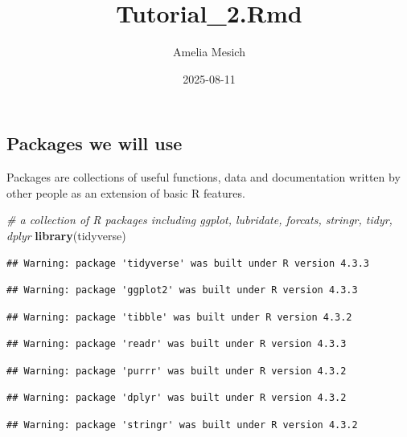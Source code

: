 \documentclass[
]{article}
\title{Tutorial\_2.Rmd}
\author{Amelia Mesich}
\date{2025-08-11}
\newenvironment{Shaded}{\begin{snugshade}}{\end{snugshade}}
\newcommand{\CommentTok}[1]{\textcolor[rgb]{0.56,0.35,0.01}{\textit{#1}}}
\newcommand{\FunctionTok}[1]{\textcolor[rgb]{0.13,0.29,0.53}{\textbf{#1}}}
\newcommand{\NormalTok}[1]{#1}
\begin{document}
\maketitle

\hypertarget{packages-we-will-use}{%
\subsection{Packages we will use}\label{packages-we-will-use}}

Packages are collections of useful functions, data and documentation
written by other people as an extension of basic R features.

\begin{Shaded}
\begin{Highlighting}[]
\CommentTok{\# a collection of R packages including ggplot, lubridate, forcats, stringr, tidyr, dplyr}
\FunctionTok{library}\NormalTok{(tidyverse)}
\end{Highlighting}
\end{Shaded}

\begin{verbatim}
## Warning: package 'tidyverse' was built under R version 4.3.3
\end{verbatim}

\begin{verbatim}
## Warning: package 'ggplot2' was built under R version 4.3.3
\end{verbatim}

\begin{verbatim}
## Warning: package 'tibble' was built under R version 4.3.2
\end{verbatim}

\begin{verbatim}
## Warning: package 'readr' was built under R version 4.3.3
\end{verbatim}

\begin{verbatim}
## Warning: package 'purrr' was built under R version 4.3.2
\end{verbatim}

\begin{verbatim}
## Warning: package 'dplyr' was built under R version 4.3.2
\end{verbatim}

\begin{verbatim}
## Warning: package 'stringr' was built under R version 4.3.2
\end{verbatim}
\end{document}
